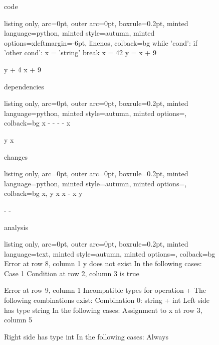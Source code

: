 \begin{figure}[!h]
 \begin{minipage}{0.32\textwidth}
 code
  \begin{tcblisting}{listing only, 
    arc=0pt,
    outer arc=0pt, 
    boxrule=0.2pt,
    minted language=python,
    minted style=autumn,
    minted options={xleftmargin=-6pt, linenos},
    colback=bg }
while 'cond':
  if 'other cond':
    x = 'string'
    break
  x = 42
  y = x + 9
  
y + 4
x + 9
\end{tcblisting}
 \end{minipage}
 \begin{minipage}{0.32\textwidth}
 dependencies
  \begin{tcblisting}{listing only, 
    arc=0pt,
    outer arc=0pt, 
    boxrule=0.2pt,
    minted language=python,
    minted style=autumn,
    minted options={},
    colback=bg }
x
-
-
-
-
x

y
x
\end{tcblisting}
 \end{minipage}
 \begin{minipage}{0.32\textwidth}
 changes
  \begin{tcblisting}{listing only, 
    arc=0pt,
    outer arc=0pt, 
    boxrule=0.2pt,
    minted language=python,
    minted style=autumn,
    minted options={},
    colback=bg }
x, y
x
x
-
x
y

-
-
\end{tcblisting}
 \end{minipage}
 \begin{minipage}{\textwidth}
 \vspace{4pt}
 analysis
  \begin{tcblisting}{listing only, 
    arc=0pt,
    outer arc=0pt, 
    boxrule=0.2pt,
    minted language=text,
    minted style=autumn,
    minted options={},
    colback=bg }
Error at row 8, column 1
  y does not exist
  In the following cases:
  Case 1
    Condition at row 2, column 3 is true
    
Error at row 9, column 1
  Incompatible types for operation +
  The following combinations exist:
  Combination 0: string + int
    Left side has type string
    In the following cases:
      Assignment to x at row 3, column 5

    Right side has type int
    In the following cases:
      Always

\end{tcblisting}
 \end{minipage}
 \label{lst:break1}
\end{figure}